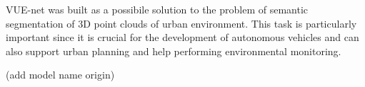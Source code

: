 VUE-net was built as a possibile solution to the problem of semantic segmentation of 
3D point clouds of urban environment.
This task is particularly important since it is crucial for the development of autonomous 
vehicles and can also support urban planning and help performing environmental monitoring.

(add model name origin)
